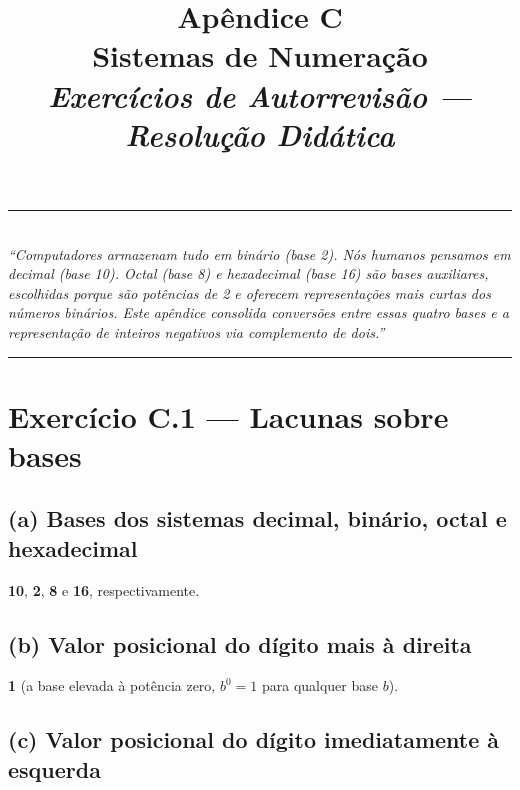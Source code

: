 \documentclass[11pt,a4paper]{article}
\title{
  \vspace{-1cm}
  {\Huge\bfseries\color{deitelblue} Ap\^endice C}\\[0.3em]
  {\Large\bfseries Sistemas de Numera\c{c}\~ao}\\[0.8em]
  {\large\itshape Exerc\'icios de Autorrevis\~ao --- Resolu\c{c}\~ao Did\'atica}
}
\author{}
\date{}
\begin{document}
\maketitle
\thispagestyle{empty}
\vspace{-2em}

\begin{center}
\rule{0.85\textwidth}{0.5pt}\\[0.4em]
\textit{``Computadores armazenam tudo em bin\'ario (base 2). N\'os humanos pensamos em decimal (base 10). Octal (base 8) e hexadecimal (base 16) s\~ao bases auxiliares, escolhidas porque s\~ao pot\^encias de 2 e oferecem representa\c{c}\~oes mais curtas dos n\'umeros bin\'arios. Este ap\^endice consolida convers\~oes entre essas quatro bases e a representa\c{c}\~ao de inteiros negativos via \emph{complemento de dois}.''}\\[0.4em]
\rule{0.85\textwidth}{0.5pt}
\end{center}

\vspace{1em}

\section{Exerc\'icio C.1 --- Lacunas sobre bases}

\subsection*{(a) Bases dos sistemas decimal, bin\'ario, octal e hexadecimal}

\begin{resposta}\textbf{10}, \textbf{2}, \textbf{8} e \textbf{16}, respectivamente.\end{resposta}

\subsection*{(b) Valor posicional do d\'igito mais \`a direita}

\begin{resposta}\textbf{1} (a base elevada \`a pot\^encia zero, $b^0 = 1$ para qualquer base $b$).\end{resposta}

\subsection*{(c) Valor posicional do d\'igito imediatamente \`a esquerda}
\end{document}
